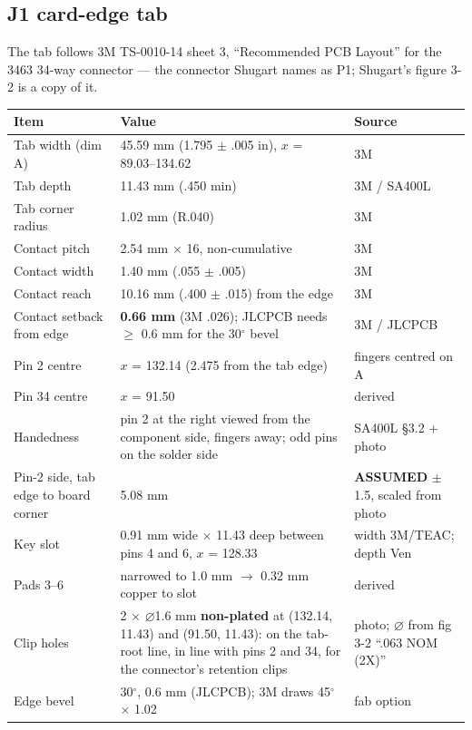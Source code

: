 \documentclass[11pt,a4paper]{article}
\newcommand{\assumed}{\textbf{\textcolor{red!70!black}{ASSUMED}}}
\begin{document}
\subsection{J1 card-edge tab}
The tab follows 3M TS-0010-14 sheet 3, ``Recommended PCB Layout'' for the 3463 34-way connector --- the
connector Shugart names as P1; Shugart's figure 3-2 is a copy of it.

\begin{center}
\begin{tabular}{@{}p{42mm}p{68mm}p{50mm}@{}}
\toprule
Item & Value & Source\\
\midrule
Tab width (dim A) & 45.59 mm (1.795 $\pm$ .005 in), $x$ = 89.03--134.62 & 3M\\
Tab depth & 11.43 mm (.450 min) & 3M / SA400L\\
Tab corner radius & 1.02 mm (R.040) & 3M\\
Contact pitch & 2.54 mm $\times$ 16, non-cumulative & 3M\\
Contact width & 1.40 mm (.055 $\pm$ .005) & 3M\\
Contact reach & 10.16 mm (.400 $\pm$ .015) from the edge & 3M\\
Contact setback from edge & \textbf{0.66 mm} (3M .026); JLCPCB needs $\ge$ 0.6 mm for the 30$^\circ$ bevel & 3M / JLCPCB\\
Pin 2 centre & $x$ = 132.14 (2.475 from the tab edge) & fingers centred on A\\
Pin 34 centre & $x$ = 91.50 & derived\\
Handedness & pin 2 at the right viewed from the component side, fingers away; odd pins on the solder side & SA400L \S3.2 + photo\\
Pin-2 side, tab edge to board corner & 5.08 mm & \assumed{} $\pm$1.5, scaled from photo\\
Key slot & 0.91 mm wide $\times$ 11.43 deep between pins 4 and 6, $x$ = 128.33 & width 3M/TEAC; depth Ven\\
Pads 3--6 & narrowed to 1.0 mm $\to$ 0.32 mm copper to slot & derived\\
Clip holes & 2 $\times$ $\varnothing$1.6 mm \textbf{non-plated} at (132.14, 11.43) and (91.50, 11.43): on the tab-root line, in line with pins 2 and 34, for the connector's retention clips & photo; $\varnothing$ from fig 3-2 ``.063 NOM (2X)''\\
Edge bevel & 30$^\circ$, 0.6 mm (JLCPCB); 3M draws 45$^\circ$ $\times$ 1.02 & fab option\\
\bottomrule
\end{tabular}
\end{center}
\end{document}
